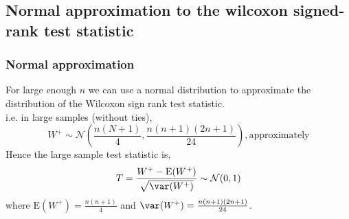 \documentclass[a4paper]{article}\usepackage[]{graphicx}\usepackage[]{xcolor}
\begin{document}
\subsection{Normal approximation to the wilcoxon signed-rank test statistic}
\subsubsection{Normal approximation}
For \textcolor{myred}{large enough} \( n \) we can use a normal distribution to approximate the distribution of the Wilcoxon sign rank test statistic.\\
i.e. in large samples (without ties),
\[
	W^+ \sim \mathcal{N} \left( \frac{n(N+1)}{4}, \frac{n(n+1)(2n+1)}{24} \right), \text{approximately}
\]
Hence the large sample test statistic is,
\[
	T = \frac{W^+ - \mathrm{E}(W^+)}{\sqrt{\var(W^+)}} \sim \mathcal{N}(0,1)
\]
where \( \mathrm{E}(W^+) = \frac{n(n+1)}{4} \) and \( \var(W^+) = \frac{n(n+1)(2n+1)}{24} \).  
\end{document}
